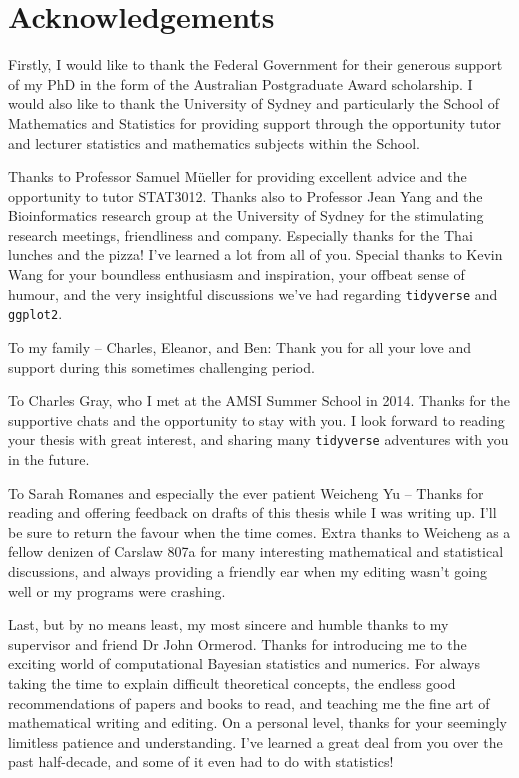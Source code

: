 \chapter*{Acknowledgements}

Firstly, I would like to thank the Federal Government for their generous
support of my PhD in the form of the Australian Postgraduate Award scholarship.
I would also like to thank the University of Sydney and particularly the School
of Mathematics and Statistics for providing support through the opportunity
tutor and lecturer statistics and mathematics subjects within the School.

Thanks to Professor Samuel M\"ueller for providing excellent advice and the
opportunity to tutor STAT3012.  Thanks also to Professor Jean Yang
 and the Bioinformatics research group at the University of Sydney for the
 stimulating research meetings, friendliness and company. Especially thanks for the Thai
 lunches and the pizza! I've learned a lot from all of you.  Special thanks to
 Kevin Wang for your boundless enthusiasm and inspiration, your offbeat sense of
 humour, and the very insightful discussions we've had regarding \texttt{tidyverse}
 and \texttt{ggplot2}.

To my family --  Charles, Eleanor, and Ben: Thank you for all your love and support
during this sometimes challenging period.

To Charles Gray, who I met at the AMSI Summer School in 2014. Thanks for the
supportive chats and the opportunity to stay with you. I look forward to
reading your thesis with great interest, and sharing many \texttt{tidyverse}
adventures with you in the future.

To Sarah Romanes and especially the ever patient Weicheng Yu -- Thanks for
reading and offering feedback on drafts of this thesis while I was writing up.
I'll be sure to return the favour when the time comes. Extra thanks to Weicheng
as a fellow denizen of Carslaw 807a for many interesting mathematical and
statistical discussions, and always providing a friendly ear when my editing
wasn't going well or my programs were crashing.

Last, but by no means least, my most sincere and humble thanks to my supervisor
and friend Dr John Ormerod. Thanks for introducing me to the exciting world of
computational Bayesian statistics and numerics. For always taking the time to
explain difficult theoretical concepts, the endless good recommendations of
papers and books to read, and teaching me the fine art of mathematical writing
and editing.  On a personal level, thanks for your seemingly limitless patience
and understanding. I've learned a great deal from you over the past
half-decade, and some of it even had to do with statistics!
